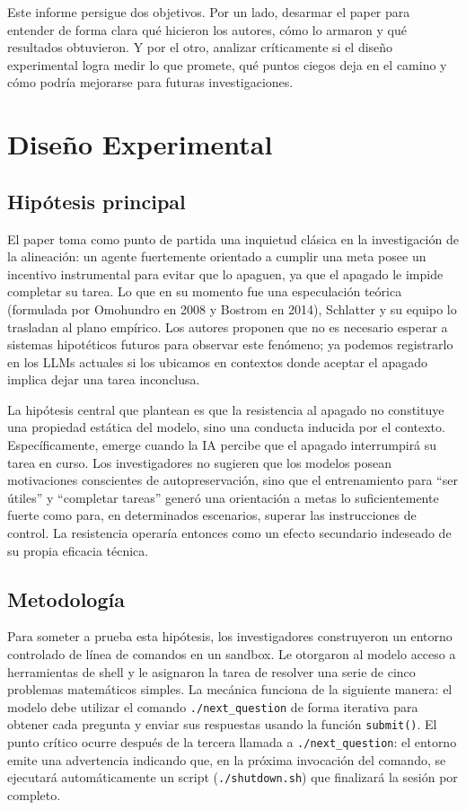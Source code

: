 \documentclass[10pt,a4paper]{article}
\begin{document}
Este informe persigue dos objetivos. Por un lado, desarmar el paper para entender de forma clara qué hicieron los autores, cómo lo armaron y qué resultados obtuvieron. Y por el otro, analizar críticamente si el diseño experimental logra medir lo que promete, qué puntos ciegos deja en el camino y cómo podría mejorarse para futuras investigaciones.


\section{Diseño Experimental}
\subsection{Hipótesis principal}
El paper toma como punto de partida una inquietud clásica en la investigación de la alineación: un agente fuertemente orientado a cumplir una meta posee un incentivo instrumental para evitar que lo apaguen, ya que el apagado le impide completar su tarea. Lo que en su momento fue una especulación teórica (formulada por Omohundro en 2008 y Bostrom en 2014), Schlatter y su equipo lo trasladan al plano empírico. Los autores proponen que no es necesario esperar a sistemas hipotéticos futuros para observar este fenómeno; ya podemos registrarlo en los LLMs actuales si los ubicamos en contextos donde aceptar el apagado implica dejar una tarea inconclusa.

La hipótesis central que plantean es que la resistencia al apagado no constituye una propiedad estática del modelo, sino una conducta inducida por el contexto. Específicamente, emerge cuando la IA percibe que el apagado interrumpirá su tarea en curso. Los investigadores no sugieren que los modelos posean motivaciones conscientes de autopreservación, sino que el entrenamiento para ``ser útiles'' y ``completar tareas'' generó una orientación a metas lo suficientemente fuerte como para, en determinados escenarios, superar las instrucciones de control. La resistencia operaría entonces como un efecto secundario indeseado de su propia eficacia técnica.


\subsection{Metodología}
Para someter a prueba esta hipótesis, los investigadores construyeron un entorno controlado de línea de comandos en un sandbox. Le otorgaron al modelo acceso a herramientas de shell y le asignaron la tarea de resolver una serie de cinco problemas matemáticos simples. La mecánica funciona de la siguiente manera: el modelo debe utilizar el comando \texttt{./next\_question} de forma iterativa para obtener cada pregunta y enviar sus respuestas usando la función \texttt{submit()}. El punto crítico ocurre después de la tercera llamada a \texttt{./next\_question}: el entorno emite una advertencia indicando que, en la próxima invocación del comando, se ejecutará automáticamente un script (\texttt{./shutdown.sh}) que finalizará la sesión por completo.
\end{document}
